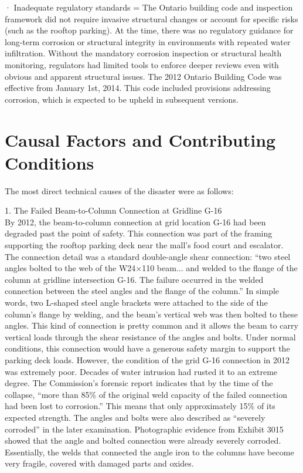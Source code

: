 \documentclass[12pt]{article}
\begin{document}
 

 · Inadequate regulatory standards = The Ontario building code and inspection framework did not require invasive structural changes or account for specific risks (such as the rooftop parking). At the time, there was no regulatory guidance for long-term corrosion or structural integrity in environments with repeated water infiltration. Without the mandatory corrosion inspection or structural health monitoring, regulators had limited tools to enforce deeper reviews even with obvious and apparent structural issues. The 2012 Ontario Building Code was effective from January 1st, 2014. This code included provisions addressing corrosion, which is expected to be upheld in subsequent versions. 


\section{Causal Factors and Contributing Conditions}

The most direct technical causes of the disaster were as follows:

1. The Failed Beam-to-Column Connection at Gridline G-16 \\
By 2012, the beam-to-column connection at grid location G-16 had been degraded past the point of safety. This connection was part of the framing supporting the rooftop parking deck near the mall’s food court and escalator. The connection detail was a standard double-angle shear connection: “two steel angles bolted to the web of the W24×110 beam... and welded to the flange of the column at gridline intersection G-16. The failure occurred in the welded connection between the steel angles and the flange of the column.” In simple words, two L-shaped steel angle brackets were attached to the side of the column’s flange by welding, and the beam’s vertical web was then bolted to these angles. This kind of connection is pretty common and it allows the beam to carry vertical loads through the shear resistance of the angles and bolts. Under normal conditions, this connection would have a generous safety margin to support the parking deck loads.
However, the condition of the grid G-16 connection in 2012 was extremely poor. Decades of water intrusion had rusted it to an extreme degree. The Commission’s forensic report indicates that by the time of the collapse, “more than 85\% of the original weld capacity of the failed connection had been lost to corrosion.” This means that only approximately 15\% of its expected strength. The angles and bolts were also described as “severely corroded” in the later examination. Photographic evidence from Exhibit 3015 showed that the angle and bolted connection were already severely corroded. Essentially, the welds that connected the angle iron to the columns have become very fragile, covered with damaged parts and oxides.
\end{document}
